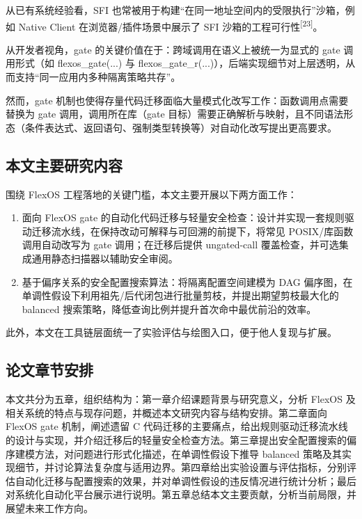 \documentclass[UTF8,a4paper,12pt]{ctexart}
\numberwithin{equation}{section}
\begin{document}
从已有系统经验看，SFI
也常被用于构建``在同一地址空间内的受限执行''沙箱，例如 Native Client
在浏览器/插件场景中展示了 SFI 沙箱的工程可行性\textsuperscript{[23]}。

从开发者视角，gate 的关键价值在于：跨域调用在语义上被统一为显式的 gate
调用形式（如 flexos\_gate(...) 与
flexos\_gate\_r(...)），后端实现细节对上层透明，从而支持``同一应用内多种隔离策略共存''。

然而，gate
机制也使得存量代码迁移面临大量模式化改写工作：函数调用点需要替换为 gate
调用，调用所在库（gate
目标）需要正确解析与映射，且不同语法形态（条件表达式、返回语句、强制类型转换等）对自动化改写提出更高要求。

\subsection{本文主要研究内容}

围绕 FlexOS 工程落地的关键门槛，本文主要开展以下两方面工作：
\begin{enumerate}
\def\labelenumi{\arabic{enumi}.}
\item
  面向 FlexOS gate
  的自动化代码迁移与轻量安全检查：设计并实现一套规则驱动迁移流水线，在保持改动可解释与可回溯的前提下，将常见
  POSIX/库函数调用自动改写为 gate 调用；在迁移后提供 ungated-call
  覆盖检查，并可选集成通用静态扫描器以辅助安全审阅。
\item
  基于偏序关系的安全配置搜索算法：将隔离配置空间建模为 DAG
  偏序图，在单调性假设下利用祖先/后代闭包进行批量剪枝，并提出期望剪枝最大化的
  balanced 搜索策略，降低查询比例并提升首次命中最优前沿的效率。
\end{enumerate}

此外，本文在工具链层面统一了实验评估与绘图入口，便于他人复现与扩展。

\subsection{论文章节安排}

本文共分为五章，组织结构为：第一章介绍课题背景与研究意义，分析 FlexOS
及相关系统的特点与现存问题，并概述本文研究内容与结构安排。第二章面向
FlexOS gate 机制，阐述遗留 C
代码迁移的主要痛点，给出规则驱动迁移流水线的设计与实现，并介绍迁移后的轻量安全检查方法。第三章提出安全配置搜索的偏序建模方法，对问题进行形式化描述，在单调性假设下推导
balanced
策略及其实现细节，并讨论算法复杂度与适用边界。第四章给出实验设置与评估指标，分别评估自动化迁移与配置搜索的效果，并对单调性假设的违反情况进行统计分析；最后对系统化自动化平台展示进行说明。第五章总结本文主要贡献，分析当前局限，并展望未来工作方向。
\end{document}
